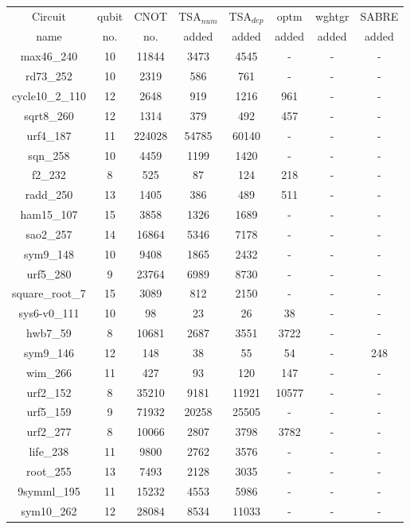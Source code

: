 \documentclass[runningheads]{llncs}
\begin{document}
		\begin{table}[H]
			\label{tab4}
			\begin{center}  
			\begin{tabular}{|c|c|c|c|c|c|c|c|}
			\hline
			Circuit &  qubit  & CNOT &TSA$_{num}$& TSA$_{dep}$  & optm 	 & wghtgr  &SABRE 	\\
			 name	&   no. 	&	no. & added&  added &  added 	&  added&  added\\
			\hline
			max46\_240 & 10 & 11844 & 3473 & 4545 & - & -& - \\
rd73\_252 & 10 & 2319 & 586 & 761 & - & -& - \\
cycle10\_2\_110 & 12 & 2648 & 919 & 1216 & 961 & -& - \\
sqrt8\_260 & 12 & 1314 & 379 & 492 & 457 & -& - \\
urf4\_187 & 11 & 224028 & 54785 & 60140 & - & -& - \\
sqn\_258 & 10 & 4459 & 1199 & 1420 & - & -& - \\
f2\_232 & 8 & 525 & 87 & 124 & 218 & -& - \\
radd\_250 & 13 & 1405 & 386 & 489 & 511 & -& - \\
ham15\_107 & 15 & 3858 & 1326 & 1689 & - & -& - \\
sao2\_257 & 14 & 16864 & 5346 & 7178 & - & -& - \\
sym9\_148 & 10 & 9408 & 1865 & 2432 & - & -& - \\
urf5\_280 & 9 & 23764 & 6989 & 8730 & - & -& - \\
square\_root\_7 & 15 & 3089 & 812 & 2150 & - & -& - \\
sys6-v0\_111 & 10 & 98 & 23 & 26 & 38 & -& - \\
hwb7\_59 & 8 & 10681 & 2687 & 3551 & 3722 & -& - \\
sym9\_146 & 12 & 148 & 38 & 55 & 54 & -& 248 \\
wim\_266 & 11 & 427 & 93 & 120 & 147 & -& - \\
urf2\_152 & 8 & 35210 & 9181 & 11921 & 10577 & -& - \\
urf5\_159 & 9 & 71932 & 20258 & 25505 & - & -& - \\
urf2\_277 & 8 & 10066 & 2807 & 3798 & 3782 & -& - \\
life\_238 & 11 & 9800 & 2762 & 3576 & - & -& - \\
root\_255 & 13 & 7493 & 2128 & 3035 & - & -& - \\
9symml\_195 & 11 & 15232 & 4553 & 5986 & - & -& - \\
sym10\_262 & 12 & 28084 & 8534 & 11033 & - & -& - \\

\end{tabular}
\end{center}
\end{table}
\end{document}
